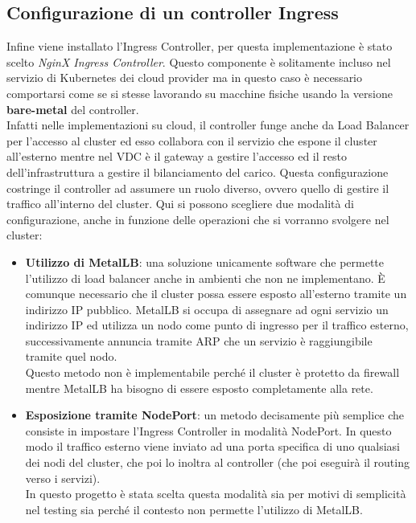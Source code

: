 \documentclass[12pt,a4paper,openright,twoside]{book}
\begin{document}
\subsection{Configurazione di un controller Ingress}
\label{sec:ingress}
Infine viene installato l'Ingress Controller, per questa implementazione è stato scelto \textit{NginX Ingress Controller}. Questo componente è solitamente
incluso nel servizio di Kubernetes dei cloud provider ma in questo caso è necessario comportarsi come se si stesse lavorando su macchine fisiche usando la 
versione \textbf{bare-metal} del controller.\\
Infatti nelle implementazioni su cloud, il controller funge anche da Load Balancer per l'accesso al cluster ed esso collabora con il servizio che espone il cluster all'esterno
mentre nel VDC è il gateway a gestire l'accesso ed il resto dell'infrastruttura a gestire il bilanciamento del carico. Questa configurazione costringe il controller ad assumere 
un ruolo diverso, ovvero quello di gestire il traffico all'interno del cluster.
Qui si possono scegliere due modalità di configurazione, anche in funzione delle operazioni che si vorranno svolgere nel cluster\cite{nginx-ingress-controller}:
\begin{itemize}
    \item \textbf{Utilizzo di MetalLB}: una soluzione unicamente software che permette l'utilizzo di load balancer anche in ambienti che non ne implementano.
        È comunque necessario che il cluster possa essere esposto all'esterno tramite un indirizzo IP pubblico. MetalLB si occupa di assegnare ad ogni servizio un
        indirizzo IP ed utilizza un nodo come punto di ingresso per il traffico esterno, successivamente annuncia tramite ARP che un servizio è raggiungibile tramite 
        quel nodo.\\
        Questo metodo non è implementabile perché il cluster è protetto da firewall mentre MetalLB ha bisogno di essere esposto completamente alla rete.
    \item {\textbf{Esposizione tramite NodePort}: un metodo decisamente più semplice che consiste in impostare l'Ingress Controller in modalità NodePort.
        In questo modo il traffico esterno viene inviato ad una porta specifica di uno qualsiasi dei nodi del cluster, che poi lo inoltra al controller (che poi
        eseguirà il routing verso i servizi).\\
        In questo progetto è stata scelta questa modalità sia per motivi di semplicità nel testing sia perché il contesto non permette l'utilizzo di MetalLB.
    }
\end{itemize}
\end{document}

